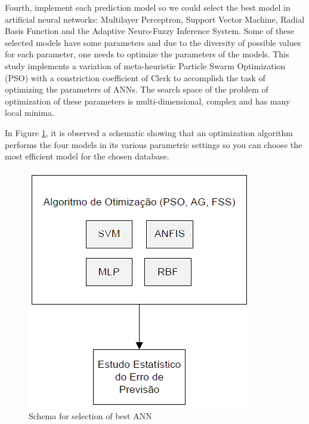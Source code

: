 Fourth, implement each prediction model so we could select the best model in artificial neural networks: Multilayer Perceptron, Support Vector Machine, Radial Basis Function and the Adaptive Neuro-Fuzzy Inference System. Some of these selected models have some parameters and due to the diversity of possible values for each parameter, one needs to optimize the parameters of the models. This study implements a variation of meta-heuristic Particle Swarm Optimization (PSO) with a constriction coefficient of Clerk \cite{engelbrecht2007computational} to accomplish the task of optimizing the parameters of ANNs. The search space of the problem of optimization of these parameters is multi-dimensional, complex and has many local minima.

In Figure \ref{fig:method2}, it is observed a schematic showing that an optimization algorithm performs the four models in its various parametric settings so you can choose the most efficient model for the chosen database.

\begin{figure}[h]
	\centering
	\includegraphics[width=.45\textwidth]{image/MetodologiaDissertacao2.png}
	\caption{Schema for selection of best ANN}
	\label{fig:method2}
\end{figure}

